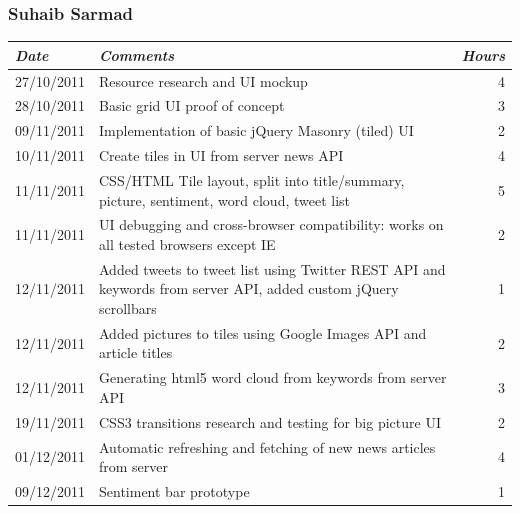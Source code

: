 \documentclass[a4paper,12pt]{article}
\begin{document}
  \subsubsection{Suhaib Sarmad}
    \begin{tabular}{l | p{10cm} r}
     \emph{\large Date} & \emph{\large Comments} & \emph{\large Hours}\\
     \hline
     27/10/2011 & Resource research and UI mockup & 4\\
     28/10/2011 & Basic grid UI proof of concept & 3\\
     09/11/2011 & Implementation of basic jQuery Masonry (tiled) UI & 2\\
     10/11/2011 & Create tiles in UI from server news API & 4\\
     11/11/2011 & CSS/HTML Tile layout, split into title/summary, picture, sentiment, word cloud, tweet list & 5\\
     11/11/2011 & UI debugging and cross-browser compatibility: works on all tested browsers except IE & 2\\
     12/11/2011 & Added tweets to tweet list using Twitter REST API and keywords from server API, added custom jQuery scrollbars & 1\\
     12/11/2011 & Added pictures to tiles using Google Images API and article titles & 2\\
     12/11/2011 & Generating html5 word cloud from keywords from server API & 3\\
     19/11/2011 & CSS3 transitions research and testing for big picture UI & 2\\
     01/12/2011 & Automatic refreshing and fetching of new news articles from server & 4\\
     09/12/2011 & Sentiment bar prototype & 1
    \end{tabular}
  
	
\end{document}
